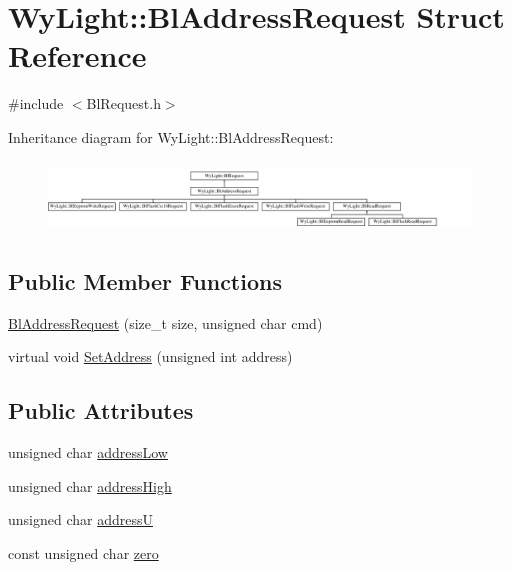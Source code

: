 \hypertarget{struct_wy_light_1_1_bl_address_request}{\section{Wy\-Light\-:\-:Bl\-Address\-Request Struct Reference}
\label{struct_wy_light_1_1_bl_address_request}
}


{\ttfamily \#include $<$Bl\-Request.\-h$>$}

Inheritance diagram for Wy\-Light\-:\-:Bl\-Address\-Request\-:\begin{figure}[H]
\begin{center}
\leavevmode
\includegraphics[height=1.885522cm]{struct_wy_light_1_1_bl_address_request}
\end{center}
\end{figure}
\subsection*{Public Member Functions}
\begin{DoxyCompactItemize}
\item 
\hyperlink{struct_wy_light_1_1_bl_address_request_a0a8d89736463ad09d739bff4bd773a45}{Bl\-Address\-Request} (size\-\_\-t size, unsigned char cmd)
\item 
virtual void \hyperlink{struct_wy_light_1_1_bl_address_request_afa463bc5ccf900bd979f547fbb39d7a7}{Set\-Address} (unsigned int address)
\end{DoxyCompactItemize}
\subsection*{Public Attributes}
\begin{DoxyCompactItemize}
\item 
unsigned char \hyperlink{struct_wy_light_1_1_bl_address_request_a27582cf3b7f0dcd17edd1ea640e0b90e}{address\-Low}
\item 
unsigned char \hyperlink{struct_wy_light_1_1_bl_address_request_a3e050aa490810811fbe60e04d4cba538}{address\-High}
\item 
unsigned char \hyperlink{struct_wy_light_1_1_bl_address_request_a1e4b9c78761aba98a236dd9358350a33}{address\-U}
\item 
const unsigned char \hyperlink{struct_wy_light_1_1_bl_address_request_a2974213d2ae8d71fb5948e4623d422c9}{zero}
\end{DoxyCompactItemize}


